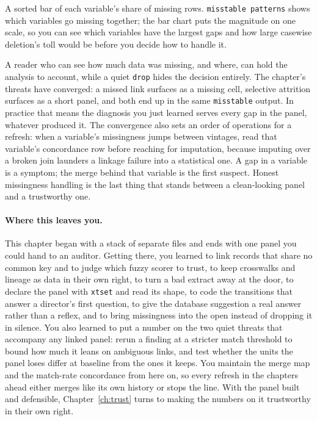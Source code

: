 \documentclass[
    a4paper,
    fontsize=10pt,
    twoside=true,
    numbers=noenddot,
]{kaobook}
\newenvironment{vizcallout}[1][Visualization to build]{%
    \begin{vizbox}[frametitle={#1}]%
}{%
    \end{vizbox}%
}
\begin{document}
\begin{vizcallout}[Visualization to build: percent missing by variable]
A sorted bar of each variable's share of missing rows. \texttt{misstable patterns} shows which variables go missing together; the bar chart puts the magnitude on one scale, so you can see which variables have the largest gaps and how large casewise deletion's toll would be before you decide how to handle it.
\end{vizcallout}

A reader who can see how much data was missing, and where, can hold the analysis to account, while a quiet \texttt{drop} hides the decision entirely. The chapter's threats have converged: a missed link surfaces as a missing cell, selective attrition surfaces as a short panel, and both end up in the same \texttt{misstable} output. In practice that means the diagnosis you just learned serves every gap in the panel, whatever produced it. The convergence also sets an order of operations for a refresh: when a variable's missingness jumps between vintages, read that variable's concordance row before reaching for imputation, because imputing over a broken join launders a linkage failure into a statistical one. A gap in a variable is a symptom; the merge behind that variable is the first suspect. Honest missingness handling is the last thing that stands between a clean-looking panel and a trustworthy one.

\paragraph{Where this leaves you.} This chapter began with a stack of separate files and ends with one panel you could hand to an auditor. Getting there, you learned to link records that share no common key and to judge which fuzzy scorer to trust, to keep crosswalks and lineage as data in their own right, to turn a bad extract away at the door, to declare the panel with \texttt{xtset} and read its shape, to code the transitions that answer a director's first question, to give the database suggestion a real answer rather than a reflex, and to bring missingness into the open instead of dropping it in silence. You also learned to put a number on the two quiet threats that accompany any linked panel: rerun a finding at a stricter match threshold to bound how much it leans on ambiguous links, and test whether the units the panel loses differ at baseline from the ones it keeps. You maintain the merge map and the match-rate concordance from here on, so every refresh in the chapters ahead either merges like its own history or stops the line. With the panel built and defensible, Chapter~\ref{ch:trust} turns to making the numbers on it trustworthy in their own right.
\end{document}
